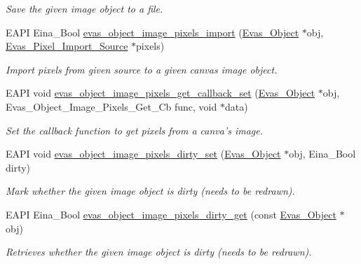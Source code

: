 \begin{DoxyCompactItemize}
\begin{DoxyCompactList}\small\item\em Save the given image object to a file. \item\end{DoxyCompactList}\item 
EAPI Eina\_\-Bool \hyperlink{group__Evas__Object__Image_gad87ced373138180afff4756fded5a4f3}{evas\_\-object\_\-image\_\-pixels\_\-import} (\hyperlink{group__Evas__Object__Group_ga9e19e6dd1f517a0ba437c0114d3e7c97}{Evas\_\-Object} $\ast$obj, \hyperlink{Evas_8h_abb01076af16fbb50a837b1893b776783}{Evas\_\-Pixel\_\-Import\_\-Source} $\ast$pixels)
\begin{DoxyCompactList}\small\item\em Import pixels from given source to a given canvas image object. \item\end{DoxyCompactList}\item 
EAPI void \hyperlink{group__Evas__Object__Image_ga1602f8906760b1c871b84b4a287a52db}{evas\_\-object\_\-image\_\-pixels\_\-get\_\-callback\_\-set} (\hyperlink{group__Evas__Object__Group_ga9e19e6dd1f517a0ba437c0114d3e7c97}{Evas\_\-Object} $\ast$obj, Evas\_\-Object\_\-Image\_\-Pixels\_\-Get\_\-Cb func, void $\ast$data)
\begin{DoxyCompactList}\small\item\em Set the callback function to get pixels from a canva's image. \item\end{DoxyCompactList}\item 
EAPI void \hyperlink{group__Evas__Object__Image_gad230eeeb0c6ba49eafd32b20afa314cb}{evas\_\-object\_\-image\_\-pixels\_\-dirty\_\-set} (\hyperlink{group__Evas__Object__Group_ga9e19e6dd1f517a0ba437c0114d3e7c97}{Evas\_\-Object} $\ast$obj, Eina\_\-Bool dirty)
\begin{DoxyCompactList}\small\item\em Mark whether the given image object is dirty (needs to be redrawn). \item\end{DoxyCompactList}\item 
EAPI Eina\_\-Bool \hyperlink{group__Evas__Object__Image_ga1d9e82da12f7831552fca02b9b313551}{evas\_\-object\_\-image\_\-pixels\_\-dirty\_\-get} (const \hyperlink{group__Evas__Object__Group_ga9e19e6dd1f517a0ba437c0114d3e7c97}{Evas\_\-Object} $\ast$obj)
\begin{DoxyCompactList}\small\item\em Retrieves whether the given image object is dirty (needs to be redrawn). \item\end{DoxyCompactList}\item 

\end{DoxyCompactItemize}

